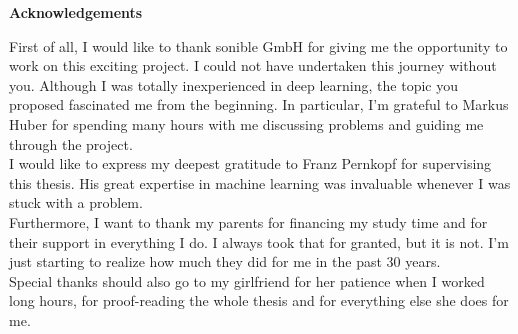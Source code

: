 \begin{center}\Large\bfseries Acknowledgements\end{center}\vspace*{1cm}\noindent
First of all, I would like to thank sonible GmbH for giving me the opportunity to work on this exciting project. I could not have undertaken this journey without you. Although I was totally inexperienced in deep learning, the topic you proposed fascinated me from the beginning. In particular, I'm grateful to Markus Huber for spending many hours with me discussing problems and guiding me through the project.\\

I would like to express my deepest gratitude to Franz Pernkopf for supervising this thesis. His great expertise in machine learning was invaluable whenever I was stuck with a problem.\\

Furthermore, I want to thank my parents for financing my study time and for their support in everything I do. I always took that for granted, but it is not. I'm just starting to realize how much they did for me in the past 30 years.\\

Special thanks should also go to my girlfriend for her patience when I worked long hours, for proof-reading the whole thesis and for everything else she does for me.